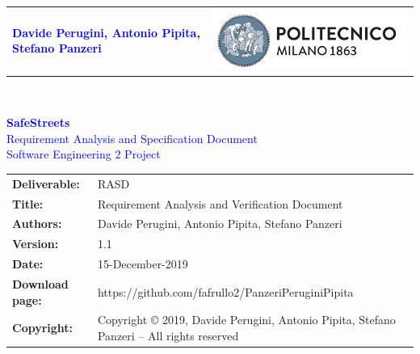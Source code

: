 




\begin{titlepage}



{\begin{table}[t!]
\centering
\begin{tabu} to \textwidth { X[1.3,r,p] X[1.7,l,p] }
\textcolor{Blue}
{\textbf{\small{Davide Perugini, Antonio Pipita, Stefano Panzeri}}} & \includegraphics[scale=0.5]{Images/PolimiLogo}
\end{tabu}
\end{table}}~\\ [7cm]


\begin{center}

{\textcolor{Blue}{\textbf{\Huge{SafeStreets}} \linebreak \\ 
		Requirement Analysis and Specification Document \\
		Software Engineering 2 Project}} \\ [1cm]

\end{center}

\end{titlepage}

\begin{table}[h!]
\begin{tabu} to \textwidth { X[0.3,r,p] X[0.7,l,p] }
\hline

\textbf{Deliverable:} & RASD\\
\textbf{Title:} & Requirement Analysis and Verification Document \\
\textbf{Authors:} & Davide Perugini, Antonio Pipita, Stefano Panzeri \\
\textbf{Version:} & 1.1 \\ 
\textbf{Date:} & 15-December-2019 \\
\textbf{Download page:} & https://github.com/fafrullo2/PanzeriPeruginiPipita \\
\textbf{Copyright:} & Copyright © 2019, Davide Perugini, Antonio Pipita, Stefano Panzeri – All rights reserved \\
\end{tabu}
\end{table}




